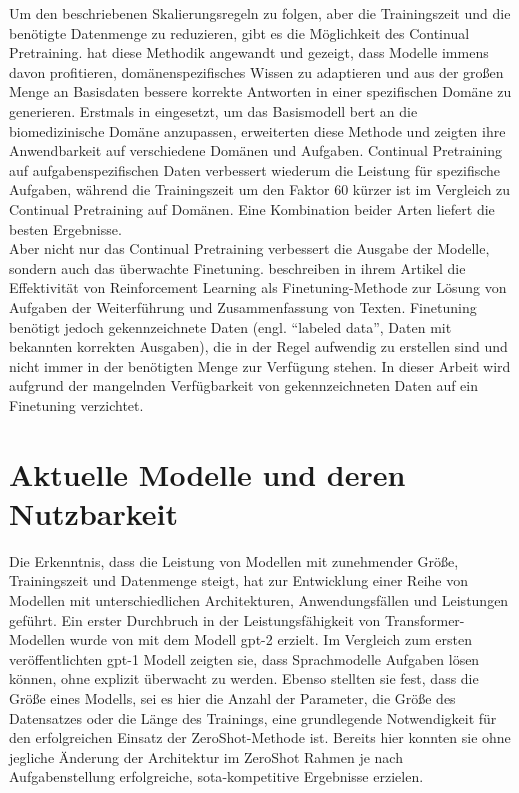 Um den beschriebenen Skalierungsregeln zu folgen, aber die Trainingszeit und die benötigte Datenmenge zu reduzieren, gibt es die Möglichkeit des Continual Pretraining.
\citet{dont_stop_pretraining} hat diese Methodik angewandt und gezeigt, dass Modelle immens davon profitieren,
domänenspezifisches Wissen zu adaptieren und aus der großen Menge an Basisdaten bessere korrekte Antworten in einer spezifischen Domäne zu generieren.
Erstmals in \citet{biobert} eingesetzt, um das Basismodell \ac{bert} an die biomedizinische Domäne anzupassen,
erweiterten \citet{dont_stop_pretraining} diese Methode und zeigten ihre Anwendbarkeit auf verschiedene Domänen und Aufgaben.
Continual Pretraining auf aufgabenspezifischen Daten verbessert wiederum die Leistung für spezifische Aufgaben,
während die Trainingszeit um den Faktor 60 kürzer ist im Vergleich zu Continual Pretraining auf Domänen.
Eine Kombination beider Arten liefert die besten Ergebnisse.\\

Aber nicht nur das Continual Pretraining verbessert die Ausgabe der Modelle, sondern auch das überwachte Finetuning.
\citet{finetuning} beschreiben in ihrem Artikel die Effektivität von Reinforcement Learning als Finetuning-Methode zur Lösung von Aufgaben der Weiterführung und Zusammenfassung von Texten.
Finetuning benötigt jedoch gekennzeichnete Daten (engl. \enquote{labeled data}, Daten mit bekannten korrekten Ausgaben),
die in der Regel aufwendig zu erstellen sind und nicht immer in der benötigten Menge zur Verfügung stehen.
In dieser Arbeit wird aufgrund der mangelnden Verfügbarkeit von gekennzeichneten Daten auf ein Finetuning verzichtet.\\

\section{Aktuelle Modelle und deren Nutzbarkeit}

Die Erkenntnis, dass die Leistung von Modellen mit zunehmender Größe, Trainingszeit und Datenmenge steigt, hat zur Entwicklung einer Reihe von Modellen mit unterschiedlichen Architekturen, Anwendungsfällen und Leistungen geführt.
Ein erster Durchbruch in der Leistungsfähigkeit von Transformer-Modellen wurde von \citet{gpt2} mit dem Modell \ac{gpt}-2 erzielt.
Im Vergleich zum ersten veröffentlichten \ac{gpt}-1 Modell \citep{gpt1} zeigten sie, dass Sprachmodelle Aufgaben lösen können, ohne explizit überwacht zu werden.
Ebenso stellten sie fest, dass die Größe eines Modells, sei es hier die Anzahl der Parameter,
die Größe des Datensatzes oder die Länge des Trainings, eine grundlegende Notwendigkeit für den erfolgreichen Einsatz der ZeroShot-Methode ist.
Bereits hier konnten sie ohne jegliche Änderung der Architektur im ZeroShot Rahmen je nach Aufgabenstellung erfolgreiche, \ac{sota}-kompetitive Ergebnisse erzielen.\\

